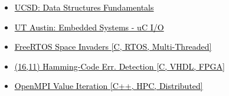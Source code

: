 \documentclass[10pt,a4paper,ragged2e,withhyper]{altacv}
\begin{document}
\begin{paracol}{2}
\begin{itemize}
    \item \href{https://courses.edx.org/certificates/f9250573933e4a3e87e8b28ea989bf99}{{\textcolor{black}{UCSD: Data Structures Fundamentals}}}
    \item \href{https://courses.edx.org/certificates/af6115bce0c646aa95f6aaa6c98acb09}{{\textcolor{black}{UT Austin: Embedded Systems - uC I/O}}}
\end{itemize}



\begin{itemize}
\item \href{https://github.com/duclos-cavalcanti/FreeRTOS-SpaceInvaders}
     {\underline{{\textcolor{black}{FreeRTOS Space Invaders}}} \hfill  \textcolor{black}{[C, RTOS, Multi-Threaded]}}

 \item \href{https://github.com/duclos-cavalcanti/microsemi-error-detection}
     {\underline{{\textcolor{black}{(16,11) Hamming-Code Err. Detection}}} \hfill  \textcolor{black}{[C, VHDL, FPGA]}}

 \item \href{https://github.com/duclos-cavalcanti/Open-MPI-ValueIteration}
     {\underline{{\textcolor{black}{OpenMPI Value Iteration}}} \hfill  \textcolor{black}{[C++, HPC, Distributed]}}


\end{itemize}
\end{paracol}
\end{document}
